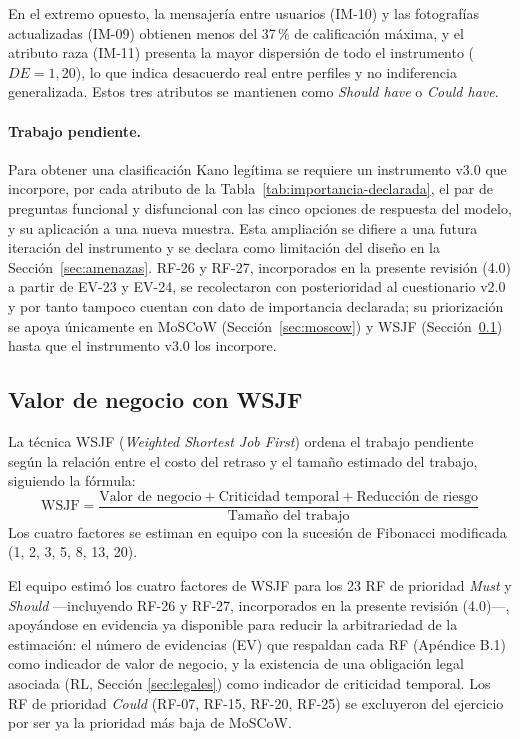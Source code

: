 \documentclass[journal,onecolumn]{IEEEtran}
\begin{document}
	En el extremo opuesto, la mensajería entre usuarios (IM-10) y las
	fotografías actualizadas (IM-09) obtienen menos del 37\,\% de calificación
	máxima, y el atributo raza (IM-11) presenta la mayor dispersión de todo el
	instrumento ($DE = 1{,}20$), lo que indica desacuerdo real entre perfiles y
	no indiferencia generalizada. Estos tres atributos se mantienen como
	\emph{Should have} o \emph{Could have}.
	
	\paragraph{Trabajo pendiente.}
	Para obtener una clasificación Kano legítima se requiere un instrumento
	v3.0 que incorpore, por cada atributo de la Tabla~\ref{tab:importancia-declarada},
	el par de preguntas funcional y disfuncional con las cinco opciones de
	respuesta del modelo, y su aplicación a una nueva muestra. Esta ampliación se
	difiere a una futura iteración del instrumento y se declara como limitación
	del diseño en la Sección~\ref{sec:amenazas}. RF-26 y RF-27, incorporados en
	la presente revisión (4.0) a partir de EV-23 y EV-24, se recolectaron con
	posterioridad al cuestionario v2.0 y por tanto tampoco cuentan con dato de
	importancia declarada; su priorización se apoya únicamente en MoSCoW
	(Sección~\ref{sec:moscow}) y WSJF (Sección~\ref{sec:wsjf}) hasta que el
	instrumento v3.0 los incorpore.
	
	\subsection{Valor de negocio con WSJF}
	\label{sec:wsjf}
	
	La técnica WSJF (\emph{Weighted Shortest Job First}) ordena el trabajo
	pendiente según la relación entre el costo del retraso y el tamaño estimado
	del trabajo, siguiendo la fórmula:
	\[
	\mathrm{WSJF} = \frac{\text{Valor de negocio} + \text{Criticidad temporal} + \text{Reducción de riesgo}}{\text{Tamaño del trabajo}}
	\]
	Los cuatro factores se estiman en equipo con la sucesión de Fibonacci
	modificada (1, 2, 3, 5, 8, 13, 20).
	
	El equipo estimó los cuatro factores de WSJF para los 23 RF de prioridad
	\emph{Must} y \emph{Should} —incluyendo RF-26 y RF-27, incorporados en la
	presente revisión (4.0)—, apoyándose en evidencia ya disponible para
	reducir la arbitrariedad de la estimación: el número de evidencias (EV) que
	respaldan cada RF (Apéndice B.1) como indicador de valor de negocio, y la
	existencia de una obligación legal asociada (RL, Sección \ref{sec:legales})
	como indicador de criticidad temporal. Los RF de prioridad \emph{Could}
	(RF-07, RF-15, RF-20, RF-25) se excluyeron del ejercicio por ser ya la
	prioridad más baja de MoSCoW.
	
\end{document}
